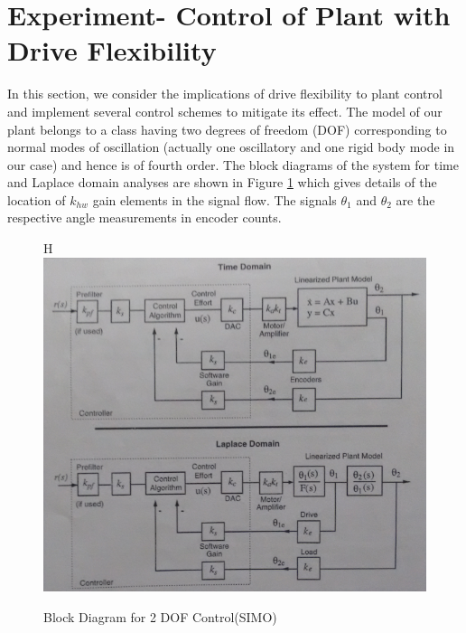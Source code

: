 \documentclass[11pt, a4paper]{article}
\begin{document}
\section{Experiment- Control of Plant with Drive Flexibility}
In this section, we consider the implications of drive flexibility to plant control and implement several control schemes to mitigate its effect. The model of our plant belongs to a class having two degrees of freedom (DOF) corresponding to normal modes of oscillation (actually one oscillatory and one rigid body mode in our case) and hence is of fourth order. The block diagrams of the system for time and Laplace domain analyses are shown in Figure \ref{SIMO} which gives details of the location of $k_{hw}$ gain elements in the signal flow. The signals $\theta_1$ and $\theta_2$ are the respective angle measurements in encoder counts.
\begin{figure}{H}
\centering
\includegraphics[width = \textwidth]{block_simo.png}
\caption{Block Diagram for 2 DOF Control(SIMO)}
\label{SIMO}
\end{figure}
\end{document}
